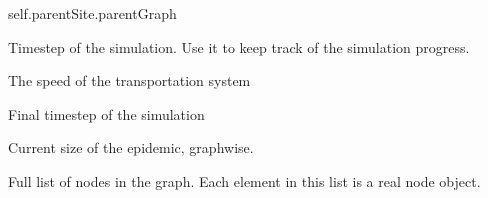 \documentclass[letterpaper,10pt,english]{sphinxmanual}
\begin{document}
\begin{fulllineitems}
\label{\detokenize{scripting:Graph}}
self.parentSite.parentGraph

\begin{fulllineitems}
\label{\detokenize{scripting:Graph.simstep}}
Time\sphinxhyphen{}step of the simulation. Use it to keep track of the simulation progress.

\end{fulllineitems}


\begin{fulllineitems}
\label{\detokenize{scripting:Graph.speed}}
The speed of the transportation system

\end{fulllineitems}


\begin{fulllineitems}
\label{\detokenize{scripting:Graph.maxstep}}
Final time\sphinxhyphen{}step of the simulation

\end{fulllineitems}


\begin{fulllineitems}
\label{\detokenize{scripting:Graph.episize}}
Current size of the epidemic, graph\sphinxhyphen{}wise.

\end{fulllineitems}


\begin{fulllineitems}
\label{\detokenize{scripting:Graph.site_list}}
Full list of nodes in the graph. Each element in this list is a real node object.


\end{fulllineitems}
\end{fulllineitems}
\end{document}
